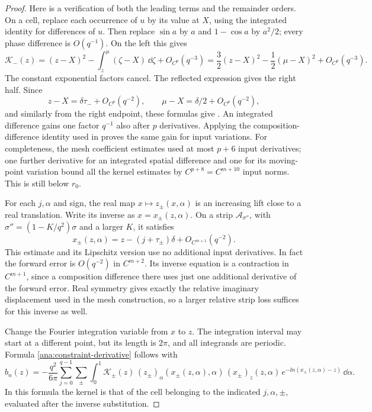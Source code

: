 \begin{proof}
Here is a verification of both the leading terms and the remainder
orders.  On a cell, replace each occurrence of \(u\) by its value at
\(X\), using the integrated identity for differences of \(u\).
Then replace \(\sin a\) by \(a\) and \(1-\cos a\) by \(a^2/2\);
every phase difference is \(O(q^{-1})\).  On the left this gives
\[
\mathcal K_-(z)
=(z-X)^2-\int_z^\mu(\zeta-X)\,\dd\zeta+O_{C^p}(q^{-3})
=\frac32(z-X)^2-\frac12(\mu-X)^2+O_{C^p}(q^{-3}).
\]
The constant exponential factors cancel.  The reflected expression
gives the right half.  Since
\[
z-X=\delta\tau_-+O_{C^p}(q^{-2}),\qquad
\mu-X=\delta/2+O_{C^p}(q^{-2}),
\]
and similarly from the right endpoint, these formulas give
.  An integrated difference gains one
factor \(q^{-1}\) also after \(p\) derivatives.  Applying the
composition-difference identity used in  proves
the same gain for input variations.  For completeness, the mesh
coefficient estimates used at most \(p+6\) input derivatives; one
further derivative for an integrated spatial difference and one for
its moving-point variation bound all the kernel estimates by
\(C^{p+8}=C^{m+10}\) input norms.  This is still below \(r_0\).

For each \(j,\alpha\) and sign, the real map \(x\mapsto z_\pm(x,\alpha)\)
is an increasing lift close to a real translation.  Write its inverse
as \(x=x_\pm(z,\alpha)\).
On a strip \(\mathcal A_{\sigma''}\), with
\(\sigma''=(1-K/q^2)\sigma\) and a larger \(K\), it satisfies
\begin{equation}\label{ana:inverse-half-cell}
x_\pm(z,\alpha)
=z-(j+\tau_\pm)\delta+O_{C^{m+1}}(q^{-2}).
\end{equation}
This estimate and its Lipschitz version use no additional input
derivatives.  In fact the forward error is \(O(q^{-2})\) in
\(C^{m+2}\).  Its inverse equation is a contraction in \(C^{m+1}\),
since a composition difference there uses just one additional
derivative of the forward error.  Real symmetry gives exactly the
relative imaginary displacement used in the mesh construction, so a
larger relative strip loss suffices for this inverse as well.

Change the Fourier integration variable from \(x\) to \(z\).
The integration interval may start at a different point, but its
length is \(2\pi\), and all integrands are periodic.  Formula
\eqref{ana:constraint-derivative} follows with
\begin{equation}\label{ana:bn-formula}
b_n(z)=
-\frac{q^2}{6\pi}
\sum_{j=0}^{q-1}\sum_{\pm}
\int_0^1
\mathcal K_\pm(z)\,
(z_\pm)_\alpha(x_\pm(z,\alpha),\alpha)\,
(x_\pm)_z(z,\alpha)\,
e^{-\ii n(x_\pm(z,\alpha)-z)}\,\dd\alpha .
\end{equation}
In this formula the kernel is that of the cell belonging to the
indicated \(j,\alpha,\pm\), evaluated after the inverse substitution.


\end{proof}
